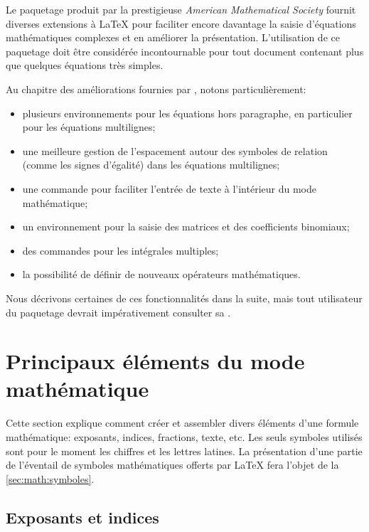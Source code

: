 Le paquetage  \citep{amsmath} produit par la prestigieuse
\emph{American Mathematical Society} fournit diverses extensions à
{\LaTeX} pour faciliter encore davantage la saisie d'équations
mathématiques complexes et en améliorer la présentation. L'utilisation
de ce paquetage doit être considérée incontournable pour tout document
contenant plus que quelques équations très simples.

Au chapitre des améliorations fournies par , notons
particulièrement:
\begin{itemize}
\item plusieurs environnements pour les équations hors paragraphe, en
  particulier pour les équations multilignes;
\item une meilleure gestion de l'espacement autour des symboles de
  relation (comme les signes d'égalité) dans les équations
  multilignes;
\item une commande pour faciliter l'entrée de texte à l'intérieur du
  mode mathématique;
\item un environnement pour la saisie des matrices et des coefficients
  binomiaux;
\item des commandes pour les intégrales multiples;
\item la possibilité de définir de nouveaux opérateurs mathématiques.
\end{itemize}
Nous décrivons certaines de ces fonctionnalités dans la suite, mais
tout utilisateur du paquetage devrait impérativement consulter sa %
.


\section{Principaux éléments du mode mathématique}
\label{sec:math:bases}

Cette section explique comment créer et assembler divers éléments
d'une formule mathématique: exposants, indices, fractions, texte, etc.
Les seuls symboles utilisés sont pour le moment les chiffres et les
lettres latines. La présentation d'une partie de l'éventail de
symboles mathématiques offerts par {\LaTeX} fera l'objet de la
\autoref{sec:math:symboles}.

\subsection{Exposants et indices}
\label{sec:math:bases:exposants}


